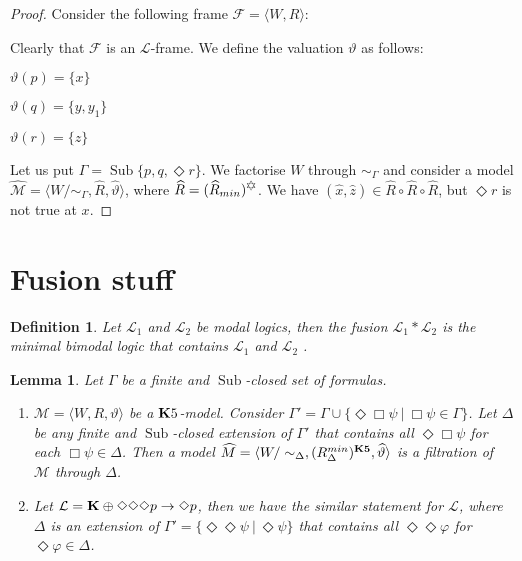 \documentclass[a4paper]{article}
\theoremstyle{defin}
\newtheorem{defin}{Definition}
\theoremstyle{theorem}
\theoremstyle{prop}
\theoremstyle{lemma}
\newtheorem{lemma}{Lemma}
\theoremstyle{fact}
\theoremstyle{exercise}
\theoremstyle{ex}
\theoremstyle{col}
\theoremstyle{claim}
\begin{document}
\begin{proof}
  Consider the following frame $\mathcal{F} = \langle W, R \rangle$:

\vspace{\baselineskip}


\vspace{\baselineskip}

  Clearly that $\mathcal{F}$ is an $\mathcal{L}$-frame. We define the valuation $\vartheta$ as follows:

  \begin{center}
    $\vartheta(p) = \{ x \}$

    $\vartheta(q) = \{ y, y_1 \}$

    $\vartheta(r) = \{ z \}$
  \end{center}
  Let us put $\Gamma = \operatorname{Sub} \{ p, q, \Diamond r \}$. We factorise $W$ through $\sim_{\Gamma}$ and consider a model $\widehat{\mathcal{M}} = \langle W / \sim_{\Gamma}, \widehat{R}, \widehat{\vartheta} \rangle$, where $\widehat{R} = (\widehat{R}_{min})^{\davidsstar}$.
  We have $(\hat{x}, \hat{z}) \in \widehat{R} \circ \widehat{R} \circ \widehat{R}$, but $\Diamond r$ is not true at $x$.
\end{proof}

\section{Fusion stuff}

\begin{defin}
  Let $\mathcal{L}_1$ and $\mathcal{L}_2$ be modal logics, then the fusion $\mathcal{L}_1 * \mathcal{L}_2$ is the minimal bimodal logic that contains $\mathcal{L}_1$ and $\mathcal{L}_2$ \cite{kurucz200715}.
\end{defin}

\begin{lemma}\label{extension}
  Let $\Gamma$ be a finite and $\operatorname{Sub}$-closed set of formulas.

  \begin{enumerate}
  \item  $\mathcal{M} = \langle W, R, \vartheta \rangle$ be a ${\bf K}5$-model. Consider $\Gamma' = \Gamma \cup \{ \Diamond \Box \psi \: | \: \Box \psi \in \Gamma \}$. Let $\Delta$ be any finite and $\operatorname{Sub}$-closed extension of $\Gamma'$ that contains all $\Diamond \Box \psi$ for each $\Box \psi \in \Delta$. Then a model $\widehat{M} = \langle W / \sim_{\Delta}, (R^{min}_{\Delta})^{\bf K5}, \widehat{\vartheta} \rangle$ is a filtration of $\mathcal{M}$ through $\Delta$.
  \item Let $\mathcal{L} = {\bf K} \oplus \Diamond \Diamond \Diamond p \to \Diamond p$, then we have the similar statement for $\mathcal{L}$, where $\Delta$ is an extension of $\Gamma' = \{ \Diamond \Diamond \psi \: | \: \Diamond \psi \}$ that contains all $\Diamond \Diamond \varphi$ for $\Diamond \varphi \in \Delta$.
  \end{enumerate}
\end{lemma}
\end{document}
